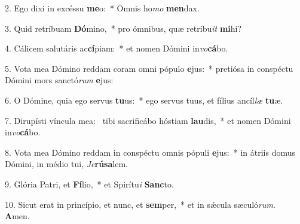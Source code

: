 2. Ego dixi in excéssu \textbf{me}o:~*  Omnis ho\textit{mo} \textbf{men}dax.\

3. Quid retríbuam \textbf{Dó}mino,~*  pro ómnibus, quæ retríbu\textit{it} \textbf{mi}hi?\

4. Cálicem salutáris ac\textbf{cí}piam:~*  et nomen Dómini in\textit{vo}\textbf{cá}bo.\

5. Vota mea Dómino reddam coram omni pópulo \textbf{e}jus:~*  pretiósa in conspéctu Dómini mors sanctó\textit{rum} \textbf{e}jus:\

6. O Dómine, quia ego servus \textbf{tu}us:~*  ego servus tuus, et fílius ancíl\textit{læ} \textbf{tu}æ.\

7. Dirupísti víncula mea: \dag\  tibi sacrificábo hóstiam \textbf{lau}dis,~*  et nomen Dómini in\textit{vo}\textbf{cá}bo.\

8. Vota mea Dómino reddam in conspéctu omnis pópuli \textbf{e}jus:~*  in átriis domus Dómini, in médio tui, \textit{Je}\textbf{rú}\textbf{sa}lem.\

9. Glória Patri, et \textbf{Fí}lio,~*  et Spirítu\textit{i} \textbf{Sanc}to.\

10. Sicut erat in princípio, et nunc, et \textbf{sem}per,~*  et in sǽcula sæculó\textit{rum}. \textbf{A}men.\

